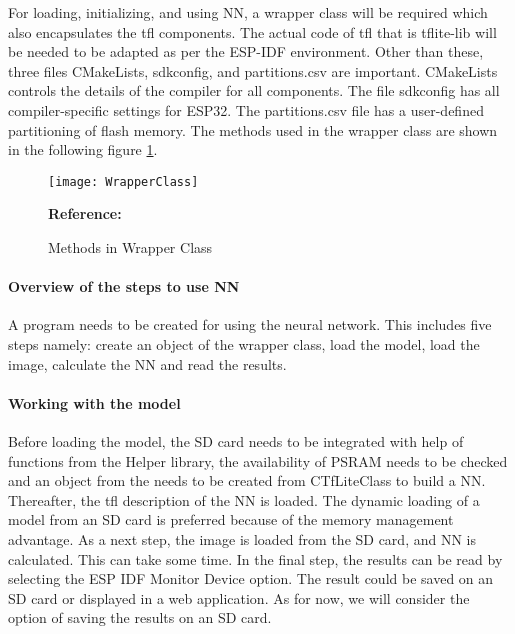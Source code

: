 For loading, initializing, and using \ac{NN}, a wrapper class will be required which also encapsulates the \ac{tfl} components. The actual code of \ac{tfl} that is tflite-lib will be needed to be adapted as per the ESP-IDF environment. Other than these, three files CMakeLists, sdkconfig, and partitions.csv are important. CMakeLists controls the details of the compiler for all components. The file sdkconfig has all compiler-specific settings for ESP32. The partitions.csv file has a user-defined partitioning of flash memory. The methods used in the wrapper class are shown in the following figure \ref{fig:WrapperClass}. \autocite{MakeMedia2021-part3}

\begin{figure}  [H]
	\begin{center}
		\texttt{[image: WrapperClass]}
		\caption{Methods in Wrapper Class} \label{fig:WrapperClass}
		{\footnotesize \textbf{Reference:} \autocite{MakeMedia2021-part3}}
	\end{center}
\end{figure}

\paragraph{Overview of the steps to use \ac{NN}}
A program needs to be created for using the neural network. This includes five steps namely: create an object of the wrapper class, load the model, load the image, calculate the \ac{NN} and read the results.

\paragraph{Working with the model}

Before loading the model, the SD card needs to be integrated with help of functions from the Helper library, the availability of PSRAM needs to be checked and an object from the needs to be created from CTfLiteClass to build a \ac{NN}.
Thereafter, the \ac{tfl} description of the \ac{NN} is loaded. The dynamic loading of a model from an SD card is preferred because of the memory management advantage. As a next step, the image is loaded from the SD card, and \ac{NN} is calculated. This can take some time. In the final step, the results can be read by selecting the ESP IDF Monitor Device option. The result could be saved on an SD card or displayed in a web application. As for now, we will consider the option of saving the results on an SD card.

